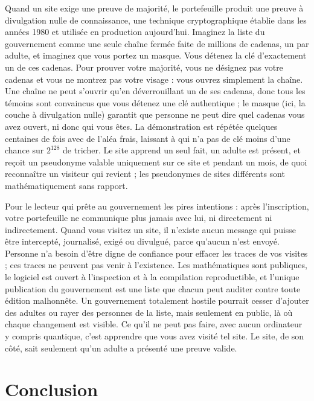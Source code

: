 \documentclass[11pt]{article}
\theoremstyle{definition}
\begin{document}
Quand un site exige une preuve de majorité, le portefeuille produit une preuve à
divulgation nulle de connaissance, une technique cryptographique établie dans les années
1980 et utilisée en production aujourd'hui. Imaginez la liste du gouvernement comme une seule
chaîne fermée faite de millions de cadenas, un par adulte, et imaginez que vous portez un
masque. Vous détenez la clé d'exactement un de ces cadenas. Pour prouver votre majorité,
vous ne désignez pas votre cadenas et vous ne montrez pas votre visage : vous ouvrez
simplement la chaîne. Une chaîne ne peut s'ouvrir qu'en déverrouillant un de ses cadenas,
donc tous les témoins sont convaincus que vous détenez une clé authentique ; le masque
(ici, la couche à divulgation nulle) garantit que personne ne peut dire quel
cadenas vous avez ouvert, ni donc qui vous êtes. La démonstration est répétée quelques
centaines de fois avec de l'aléa frais, laissant à qui n'a pas de clé moins d'une chance
sur $2^{128}$ de tricher. Le site
apprend un seul fait, un adulte est présent, et reçoit un pseudonyme valable uniquement
sur ce site et pendant un mois, de quoi reconnaître un visiteur qui revient ; les
pseudonymes de sites différents sont mathématiquement sans rapport.

Pour le lecteur qui prête au gouvernement les pires intentions : après l'inscription,
votre portefeuille ne communique plus jamais avec lui, ni directement ni indirectement.
Quand
vous visitez un site, il n'existe aucun message qui puisse être intercepté, journalisé,
exigé ou divulgué, parce qu'aucun n'est envoyé. Personne n'a besoin d'être digne de
confiance pour effacer les traces de vos visites ; ces traces ne peuvent pas venir à
l'existence. Les mathématiques sont publiques, le logiciel est ouvert à l'inspection et à
la compilation reproductible, et l'unique publication du gouvernement est une liste que
chacun peut auditer contre toute édition malhonnête. Un gouvernement totalement hostile
pourrait cesser d'ajouter des adultes ou rayer des personnes de la liste, mais seulement
en public, là où chaque changement est visible. Ce qu'il ne peut pas faire, avec aucun
ordinateur y compris quantique, c'est apprendre que vous avez visité tel site. Le site, de
son côté, sait seulement qu'un adulte a présenté une preuve valide.

\section{Conclusion}
\end{document}
